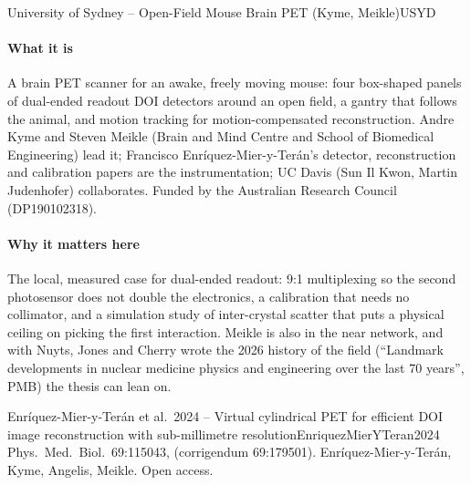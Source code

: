 \begin{programnote}{University of Sydney -- Open-Field Mouse Brain PET (Kyme, Meikle)}{USYD}

\paragraph{What it is}
A brain PET scanner for an awake, freely moving mouse: four box-shaped panels of
dual-ended readout DOI detectors around an open field, a gantry that follows the
animal, and motion tracking for motion-compensated reconstruction. Andre Kyme
and Steven Meikle (Brain and Mind Centre and School of Biomedical Engineering)
lead it; Francisco Enríquez-Mier-y-Terán's detector, reconstruction and
calibration papers are the instrumentation; UC Davis (Sun Il Kwon, Martin
Judenhofer) collaborates. Funded by the Australian Research Council
(DP190102318).

\paragraph{Why it matters here}
The local, measured case for dual-ended readout: 9:1 multiplexing so the second
photosensor does not double the electronics, a calibration that needs no
collimator, and a simulation study of inter-crystal scatter that puts a
physical ceiling on picking the first interaction. Meikle is also in the near
network, and with Nuyts, Jones and Cherry wrote the 2026 history of the field
(``Landmark developments in nuclear medicine physics and engineering over the
last 70 years'', PMB) the thesis can lean on.

\begin{papernote}{Enríquez-Mier-y-Terán et al.\ 2024 -- Virtual cylindrical PET for efficient DOI image reconstruction with sub-millimetre resolution}{EnriquezMierYTeran2024}
Phys.\ Med.\ Biol.\ 69:115043,  (corrigendum
69:179501). Enríquez-Mier-y-Terán, Kyme, Angelis, Meikle. Open access.


\end{papernote}
\end{programnote}
